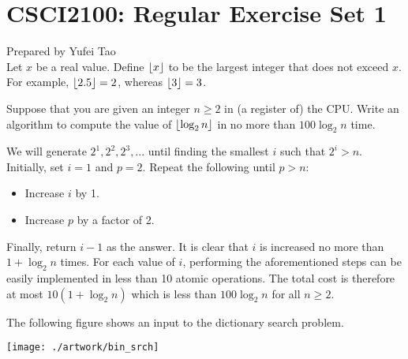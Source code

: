 


\usepackage{amsfonts, amsmath, amssymb, amsthm}
\usepackage{comment}
\usepackage{graphicx}
\usepackage{ifthen}
\usepackage{latexsym}



\def\dom{\prec}
\def\T{\mathcal{T}}




\section*{CSCI2100: Regular Exercise Set 1}
Prepared by Yufei Tao \\


 Let $x$ be a real value. Define $\lfloor x \rfloor$ to be the largest integer that does not exceed $x$. For example, $\lfloor 2.5 \rfloor = 2$, whereas $\lfloor 3 \rfloor = 3$. 

\vgap

Suppose that you are given an integer $n \ge 2$ in (a register of) the CPU. Write an algorithm to compute the value of $\lfloor \log_2 n \rfloor$ in no more than $100 \log_2 n$ time. 

\begin{sol}
 We will generate $2^1, 2^2, 2^3, ...$ until finding the smallest $i$ such that $2^i > n$. Initially, set $i = 1$ and $p = 2$. Repeat the following until $p > n$: 
\begin{itemize} 
 \item Increase $i$ by 1. 
 \item Increase $p$ by a factor of 2.  
\end{itemize}
Finally, return $i - 1$ as the answer. It is clear that $i$ is increased no more than $1 + \log_2 n$ times. For each value of $i$, performing the aforementioned steps can be easily implemented in less than 10 atomic operations. The total cost is therefore at most $10 (1 + \log_2 n)$ which is less than $100 \log_2 n$ for all $n \ge 2$.
\end{sol}

 The following figure shows an input to the dictionary search problem. 

\begin{center} 
    \texttt{[image: ./artwork/bin\_srch]}
\end{center}

